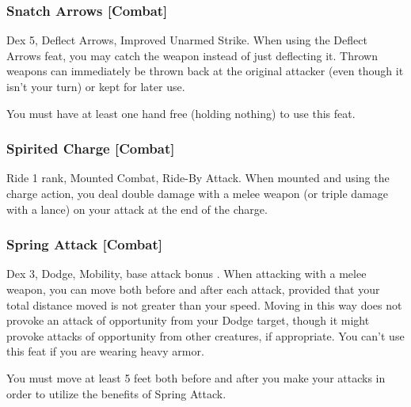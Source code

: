 \subsubsection{Snatch Arrows [Combat]}
 Dex 5, Deflect Arrows, Improved Unarmed Strike.
 When using the Deflect Arrows feat, you may catch the weapon instead of just deflecting it. Thrown weapons can immediately be thrown back at the original attacker (even though it isn't your turn) or kept for later use.
\par You must have at least one hand free (holding nothing) to use this feat.%

\subsubsection{Spirited Charge [Combat]}
 Ride 1 rank, Mounted Combat, Ride-By Attack.
 When mounted and using the charge action, you deal double damage with a melee weapon (or triple damage with a lance) on your attack at the end of the charge.%

\subsubsection{Spring Attack [Combat]}
 Dex 3, Dodge, Mobility, base attack bonus .
 When attacking with a melee weapon, you can move both before and after each attack, provided that your total distance moved is not greater than your speed. Moving in this way does not provoke an attack of opportunity from your Dodge target, though it might provoke attacks of opportunity from other creatures, if appropriate. You can't use this feat if you are wearing heavy armor.
\par You must move at least 5 feet both before and after you make your attacks in order to utilize the benefits of Spring Attack.%

